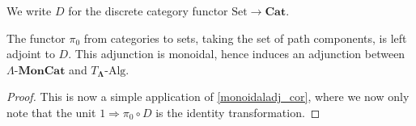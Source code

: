 \documentclass{amsbook} %
\newcommand{\mb}{\mathbf}
\newcommand{\Set}{\ensuremath{\textrm{Set}}}
\newcommand{\ML}{\mathbf{\Lambda}}
\newcommand{\ELn}{E\Lambda(\underline{n})}
\newcommand{\lmc}{\Lambda\mbox{-}\mb{MonCat}}
\newcommand{\sets}{\Set}
\newcommand{\mon}{\ensuremath{\mb{Mon}}}
\newcommand{\cat}{\ensuremath{\mb{Cat}}}
\numberwithin{section}{chapter}
\begin{document}
\begin{nota}
We write $D$ for the discrete category functor $\sets \to \cat$.
\end{nota}

\begin{prop}\label{pi0-D_adj}
The functor $\pi_0$ from categories to sets, taking the set of path components, is left adjoint to  $D$. This adjunction is monoidal, hence induces an adjunction between $\lmc$ and $T_{\ML}\mbox{-}\textrm{Alg}$.
\end{prop}
\begin{proof}
This is now a simple application of \cref{monoidaladj_cor}, where we now only note that the unit $1 \Rightarrow \pi_0 \circ D$ is the identity transformation.
\end{proof}



%
\end{document}
